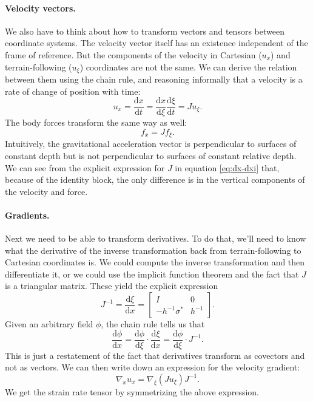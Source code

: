 \documentclass[gmd, manuscript]{copernicus}
\begin{document}
\paragraph{Velocity vectors.}
We also have to think about how to transform vectors and tensors between coordinate systems.
The velocity vector itself has an existence independent of the frame of reference.
But the components of the velocity in Cartesian ($u_x$) and terrain-following ($u_\xi$) coordinates are not the same.
We can derive the relation between them using the chain rule, and reasoning informally that a velocity is a rate of change of position with time:
\begin{equation}
    u_x = \frac{\mathrm dx}{\mathrm dt} = \frac{\mathrm dx}{\mathrm d\xi}\frac{\mathrm d\xi}{\mathrm dt} = Ju_\xi.
    \label{eq:xform-velocity}
\end{equation}
The body forces transform the same way as well:
\begin{equation}
    f_x = Jf_\xi.
\end{equation}
Intuitively, the gravitational acceleration vector is perpendicular to surfaces of constant depth but is not perpendicular to surfaces of constant relative depth.
We can see from the explicit expression for $J$ in equation \eqref{eq:dx-dxi} that, because of the identity block, the only difference is in the vertical components of the velocity and force.

\paragraph{Gradients.}
Next we need to be able to transform derivatives.
To do that, we'll need to know what the derivative of the inverse transformation back from terrain-following to Cartesian coordinates is.
We could compute the inverse transformation and then differentiate it, or we could use the implicit function theorem and the fact that $J$ is a triangular matrix.
These yield the explicit expression
\begin{equation}
    J^{-1} = \frac{\mathrm d\xi}{\mathrm dx} = \left[\begin{matrix}I & 0 \\ -h^{-1}\sigma^* & h^{-1}\end{matrix}\right].
    \label{eq:dxi-dx}
\end{equation}
Given an arbitrary field $\phi$, the chain rule tells us that
\begin{equation}
    \frac{\mathrm d\phi}{\mathrm dx} = \frac{\mathrm d\phi}{\mathrm d\xi}\cdot\frac{\mathrm d\xi}{\mathrm dx} = \frac{\mathrm d\phi}{\mathrm d\xi}\cdot J^{-1}.
    \label{eq:xform-gradient}
\end{equation}
This is just a restatement of the fact that derivatives transform as covectors and not as vectors.
We can then write down an expression for the velocity gradient:
\begin{equation}
    \nabla_xu_x = \nabla_\xi(Ju_\xi)J^{-1}.
    \label{eq:velocity-gradient}
\end{equation}
We get the strain rate tensor by symmetrizing the above expression.
\end{document}
